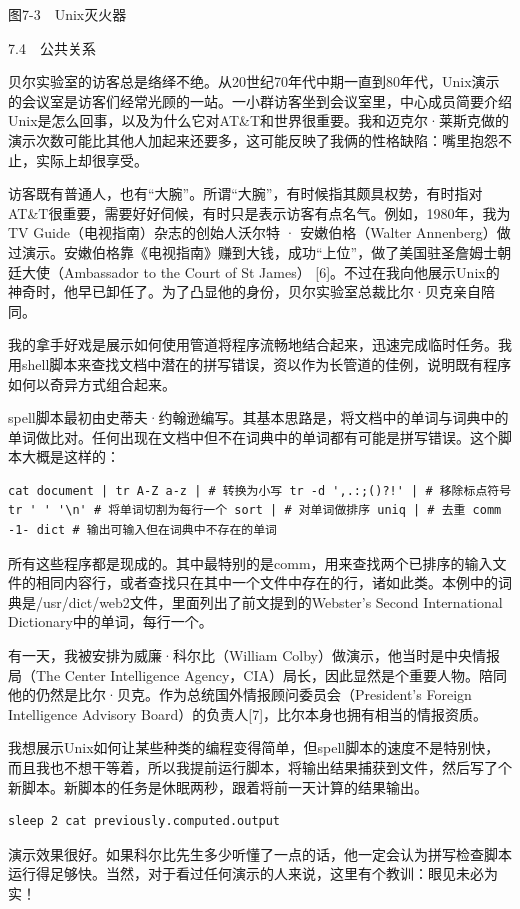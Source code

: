 \documentclass[a4paper,12pt,UTF8,twoside]{ctexbook}
\begin{document}
图7-3　Unix灭火器





7.4　公共关系


贝尔实验室的访客总是络绎不绝。从20世纪70年代中期一直到80年代，Unix演示的会议室是访客们经常光顾的一站。一小群访客坐到会议室里，中心成员简要介绍Unix是怎么回事，以及为什么它对AT\&T和世界很重要。我和迈克尔·莱斯克做的演示次数可能比其他人加起来还要多，这可能反映了我俩的性格缺陷：嘴里抱怨不止，实际上却很享受。

访客既有普通人，也有“大腕”。所谓“大腕”，有时候指其颇具权势，有时指对AT\&T很重要，需要好好伺候，有时只是表示访客有点名气。例如，1980年，我为TV Guide（电视指南）杂志的创始人沃尔特 · 安嫩伯格（Walter Annenberg）做过演示。安嫩伯格靠《电视指南》赚到大钱，成功“上位”，做了美国驻圣詹姆士朝廷大使（Ambassador to the Court of St James） [6]。不过在我向他展示Unix的神奇时，他早已卸任了。为了凸显他的身份，贝尔实验室总裁比尔·贝克亲自陪同。

我的拿手好戏是展示如何使用管道将程序流畅地结合起来，迅速完成临时任务。我用shell脚本来查找文档中潜在的拼写错误，资以作为长管道的佳例，说明既有程序如何以奇异方式组合起来。

spell脚本最初由史蒂夫·约翰逊编写。其基本思路是，将文档中的单词与词典中的单词做比对。任何出现在文档中但不在词典中的单词都有可能是拼写错误。这个脚本大概是这样的：
\begin{lstlisting}
cat document | tr A-Z a-z | # 转换为小写 tr -d ',.:;()?!' | # 移除标点符号 tr ' ' '\n' # 将单词切割为每行一个 sort | # 对单词做排序 uniq | # 去重 comm -1- dict # 输出可输入但在词典中不存在的单词
\end{lstlisting}
所有这些程序都是现成的。其中最特别的是comm，用来查找两个已排序的输入文件的相同内容行，或者查找只在其中一个文件中存在的行，诸如此类。本例中的词典是/usr/dict/web2文件，里面列出了前文提到的Webster’s Second International Dictionary中的单词，每行一个。

有一天，我被安排为威廉·科尔比（William Colby）做演示，他当时是中央情报局（The Center Intelligence Agency，CIA）局长，因此显然是个重要人物。陪同他的仍然是比尔·贝克。作为总统国外情报顾问委员会（President’s Foreign Intelligence Advisory Board）的负责人[7]，比尔本身也拥有相当的情报资质。

我想展示Unix如何让某些种类的编程变得简单，但spell脚本的速度不是特别快，而且我也不想干等着，所以我提前运行脚本，将输出结果捕获到文件，然后写了个新脚本。新脚本的任务是休眠两秒，跟着将前一天计算的结果输出。
\begin{lstlisting}
sleep 2 cat previously.computed.output
\end{lstlisting}
演示效果很好。如果科尔比先生多少听懂了一点的话，他一定会认为拼写检查脚本运行得足够快。当然，对于看过任何演示的人来说，这里有个教训：眼见未必为实！
\end{document}
